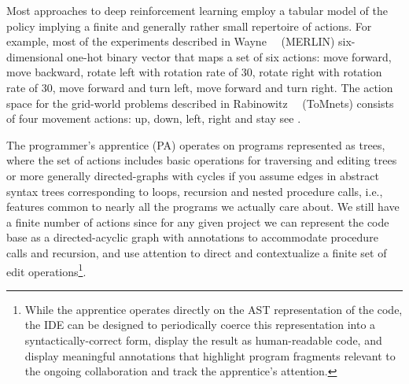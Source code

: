 




Most approaches to deep reinforcement learning employ a tabular model of the policy implying a finite \emdash{} and generally rather small \emdash{} repertoire of actions. For example, most of the experiments described in Wayne~\etal{}~\cite{WayneetalCoRR-18} (MERLIN) six-dimensional one-hot binary vector that maps a set of six actions: move forward, move backward, rotate left with rotation rate of 30, rotate right with rotation rate of 30, move forward and turn left, move forward and turn right. The action space for the grid-world problems described in Rabinowitz~\etal{}~\cite{RabinowitzetalCoRR-18} (ToMnets) consists of four movement actions: up, down, left, right and stay \emdash{} see {{}}.

The programmer's apprentice (PA) operates on programs represented as trees, where the set of actions includes basic operations for traversing and editing trees \emdash{} or more generally directed-graphs with cycles if you assume edges in abstract syntax trees corresponding to loops, recursion and nested procedure calls, i.e., features common to nearly all the programs we actually care about. We still have a finite number of actions since for any given project we can represent the code base as a directed-acyclic graph with annotations to accommodate procedure calls and recursion, and use attention to direct and contextualize a finite set of edit operations\footnote{%
%
  While the apprentice operates directly on the AST representation of the code, the IDE can be designed to periodically coerce this representation into a syntactically-correct form, display the result as human-readable code, and display meaningful annotations that highlight program fragments relevant to the ongoing collaboration and track the apprentice's attention.}.

